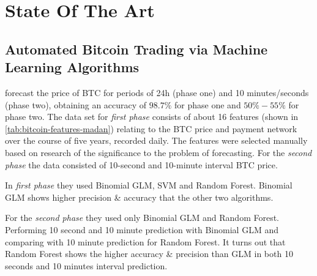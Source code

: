 
\chapter{State Of The Art} %

\label{ch:state-of-the-art}


\section[\cite{madan_automated_2014}] {Automated Bitcoin Trading
  via Machine Learning Algorithms}

\label{sec:automated-bitcoin-trading-via-machine-learning-algorithms}

\cite{madan_automated_2014} forecast the price of BTC for periods
of 24h (phase one) and 10 minutes/seconds (phase two), obtaining an
accuracy of $98.7\%$
for phase one and $50\% - 55\%$
for phase two. The data set for \textit{first phase} consists of about
16 features (shown in \autoref{tab:bitcoin-features-madan}) relating
to the BTC price and payment network over the course of five years,
recorded daily. The features were selected manually based on research
of the significance to the problem of forecasting. For the
\textit{second phase} the data consisted of 10-second and 10-minute
interval BTC price.

In \textit{first phase} they used Binomial GLM, SVM and Random Forest.
Binomial GLM shows higher precision \& accuracy that the other two
algorithms.

For the \textit{second phase} they used only Binomial GLM and Random
Forest. Performing 10 second and 10 minute prediction with Binomial
GLM and comparing with 10 minute prediction for Random Forest. It
turns out that Random Forest shows the higher accuracy \& precision
than GLM in both 10 seconds and 10 minutes interval prediction.

